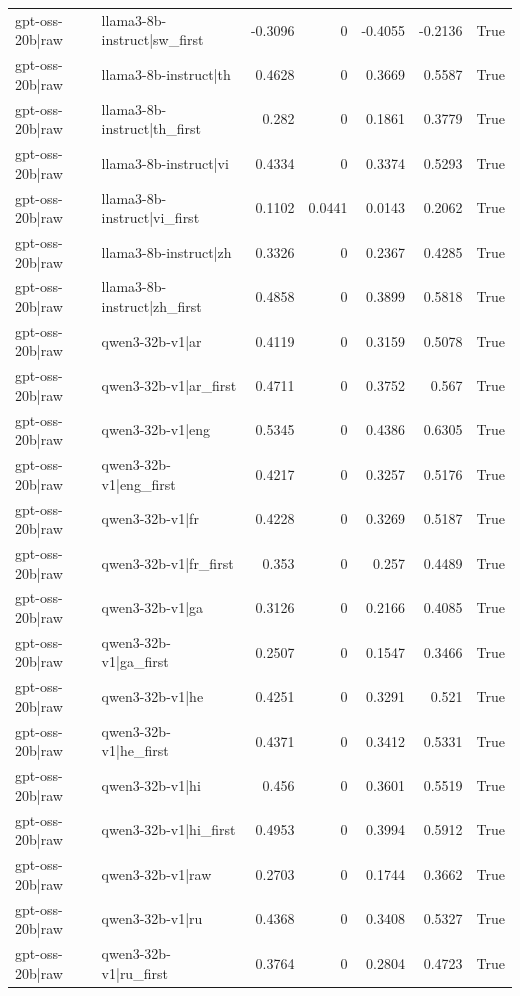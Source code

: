 \begin{table}
\begin{tabular}{l l r r r r l}
gpt-oss-20b|raw & llama3-8b-instruct|sw_first & -0.3096 & 0 & -0.4055 & -0.2136 & True \\
gpt-oss-20b|raw & llama3-8b-instruct|th & 0.4628 & 0 & 0.3669 & 0.5587 & True \\
gpt-oss-20b|raw & llama3-8b-instruct|th_first & 0.282 & 0 & 0.1861 & 0.3779 & True \\
gpt-oss-20b|raw & llama3-8b-instruct|vi & 0.4334 & 0 & 0.3374 & 0.5293 & True \\
gpt-oss-20b|raw & llama3-8b-instruct|vi_first & 0.1102 & 0.0441 & 0.0143 & 0.2062 & True \\
gpt-oss-20b|raw & llama3-8b-instruct|zh & 0.3326 & 0 & 0.2367 & 0.4285 & True \\
gpt-oss-20b|raw & llama3-8b-instruct|zh_first & 0.4858 & 0 & 0.3899 & 0.5818 & True \\
gpt-oss-20b|raw & qwen3-32b-v1|ar & 0.4119 & 0 & 0.3159 & 0.5078 & True \\
gpt-oss-20b|raw & qwen3-32b-v1|ar_first & 0.4711 & 0 & 0.3752 & 0.567 & True \\
gpt-oss-20b|raw & qwen3-32b-v1|eng & 0.5345 & 0 & 0.4386 & 0.6305 & True \\
gpt-oss-20b|raw & qwen3-32b-v1|eng_first & 0.4217 & 0 & 0.3257 & 0.5176 & True \\
gpt-oss-20b|raw & qwen3-32b-v1|fr & 0.4228 & 0 & 0.3269 & 0.5187 & True \\
gpt-oss-20b|raw & qwen3-32b-v1|fr_first & 0.353 & 0 & 0.257 & 0.4489 & True \\
gpt-oss-20b|raw & qwen3-32b-v1|ga & 0.3126 & 0 & 0.2166 & 0.4085 & True \\
gpt-oss-20b|raw & qwen3-32b-v1|ga_first & 0.2507 & 0 & 0.1547 & 0.3466 & True \\
gpt-oss-20b|raw & qwen3-32b-v1|he & 0.4251 & 0 & 0.3291 & 0.521 & True \\
gpt-oss-20b|raw & qwen3-32b-v1|he_first & 0.4371 & 0 & 0.3412 & 0.5331 & True \\
gpt-oss-20b|raw & qwen3-32b-v1|hi & 0.456 & 0 & 0.3601 & 0.5519 & True \\
gpt-oss-20b|raw & qwen3-32b-v1|hi_first & 0.4953 & 0 & 0.3994 & 0.5912 & True \\
gpt-oss-20b|raw & qwen3-32b-v1|raw & 0.2703 & 0 & 0.1744 & 0.3662 & True \\
gpt-oss-20b|raw & qwen3-32b-v1|ru & 0.4368 & 0 & 0.3408 & 0.5327 & True \\
gpt-oss-20b|raw & qwen3-32b-v1|ru_first & 0.3764 & 0 & 0.2804 & 0.4723 & True \\

\end{tabular}
\end{table}
